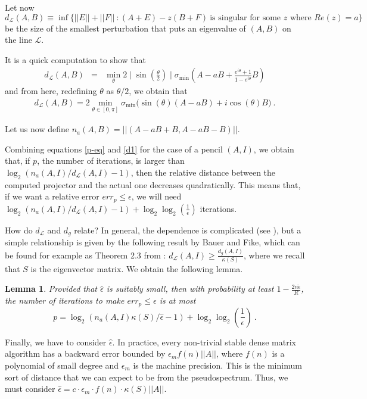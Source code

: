 \documentclass{article}
\newtheorem{lemma}[theorem]{Lemma}
\theoremstyle{definition}
\begin{document}
Let now $$d_{\mathcal{L}}(A,B) \equiv \inf\{||E||+||F||~: (A+E) - z(B+F) ~\mbox{is singular for some $z$ where $Re(z) = a$}\}$$ be the size of the smallest perturbation that puts an eigenvalue of $(A,B)$ on the line $\mathcal{L}$.

It is a quick computation to show that 
\begin{eqnarray*}
d_{\mathcal{L}}(A,B) & = & \min_{\theta} 2  \mid \sin(\frac{\theta}{2}) \mid \sigma_{\min} (A-aB + \frac{e^{i \theta}+1}{1-e^{i\theta}}B)
\end{eqnarray*}
and from here, redefining $\theta$ as $\theta/2$, we obtain that
\begin{eqnarray} \label{d1}
d_{\mathcal{L}}(A,B) = 2 \min_{\theta \in [0, \pi]} \sigma_{\min} \Big ( \sin(\theta) (A-aB) + i \cos(\theta)B \Big)~.
\end{eqnarray}

Let us now define $n_a(A,B) = ||(A-aB+B, A-aB-B)||$.

Combining equations \eqref{p-eq} and \eqref{d1} for the case of a pencil $(A, I)$, we obtain that, if $p$, the number of iterations, is larger than $\log_2(n_a(A,I) /d_{\mathcal{L}}(A,I)-1)$, then the relative distance between the computed projector and the actual one decreases quadratically. This means that, if we want a relative error $err_p \leq \epsilon$, we will need $\log_2(n_a(A,I) /d_{\mathcal{L}}(A,I)-1) + \log_2 \log_2 \left ( \frac{1}{\epsilon} \right)$ iterations. 

How do $d_{\mathcal{L}}$ and $d_g$ relate? In general, the dependence is complicated (see \cite{trefethenreichel}), but a simple relationship is given by the following result by Bauer and Fike, which can be found for example as Theorem 2.3 from \cite{TE05}: $d_{\mathcal{L}}(A, I) \geq \frac{d_g(A, I)}{\kappa(S)}$, where we recall that $S$ is the eigenvector matrix. We obtain the following lemma.

\begin{lemma} \label{d2}
Provided that $\hat{\epsilon}$ is suitably small, then with probability at least $1 - \frac{2 n \hat{\epsilon}}{R}$, the number of iterations to make $err_p \leq \epsilon$ is at most
$$ p = \log_2(n_a(A,I) \kappa(S) / \hat{\epsilon} - 1) + \log_2 \log_2 \left ( \frac{1}{\epsilon} \right )~.$$
\end{lemma}

Finally, we have to consider $\hat{\epsilon}$. In practice, every non-trivial stable dense matrix algorithm has a backward error bounded by $\epsilon_m f(n) ||A||$, where $f(n)$ is a polynomial of small degree and $\epsilon_m$ is the machine precision. This is the minimum sort of distance that we can expect to be from the pseudospectrum. Thus, we must consider $\hat{\epsilon} = c \cdot \epsilon_{m} \cdot f(n) \cdot \kappa(S) ||A||$.
\end{document}
